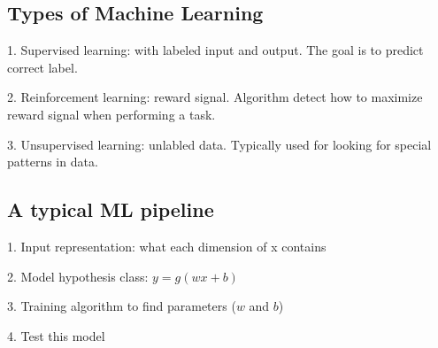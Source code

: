 \documentclass{article}
\begin{document}
\subsection*{Types of Machine Learning}

1. Supervised learning: with labeled input and output. The goal is to predict correct label.

2. Reinforcement learning: reward signal. Algorithm detect how to maximize reward signal when performing a task.

3. Unsupervised learning: unlabled data. Typically used for looking for special patterns in data.


\subsection*{A typical ML pipeline}

1. Input representation: what each dimension of x contains

2. Model hypothesis class: $y = g (wx+b)$

3. Training algorithm to find parameters ($w$ and $b$)

4. Test this model
\end{document}
